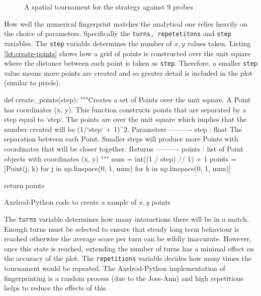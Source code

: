 \begin{figure}[!hbtp]
    \begin{center}
        
        \caption{A spatial tournament for the strategy against 9 probes}\label{fig:spatialtourn}
    \end{center}
\end{figure}


How well the numerical fingerprint matches the analytical one relies heavily on the choice of parameters.
Specifically the \texttt{turns, repetetitons} and \texttt{step} variables.
The \texttt{step} variable determines the number of $x,y$ values taken.
Listing \ref{lst:create-points} shows how a grid of points is constructed over the unit square where the distance between each point is taken as \texttt{step}.
Therefore, a smaller \texttt{step} value means more points are created and so greater detail is included in the plot (similar to pixels).

\begin{listing}[hbtp!]
\begin{SourceCode}
def create_points(step):
    """Creates a set of Points over the unit square.
    A Point has coordinates (x, y). This function constructs points that are
    separated by a step equal to `step`. The points are over the unit
    square which implies that the number created will be (1/`step` + 1)^2.
    Parameters
    ----------
    step : float
        The separation between each Point. Smaller steps will produce more
        Points with coordinates that will be closer together.
    Returns
    ----------
    points : list
        of Point objects with coordinates (x, y)
    """
    num = int((1 / step) // 1) + 1
    points = [Point(j, k) for j in np.linspace(0, 1, num)
              for k in np.linspace(0, 1, num)]

    return points
\end{SourceCode}
\caption{Axelrod-Python code to create a sample of $x,y$ points}
\label{lst:create-points}
\end{listing}

The \texttt{turns} variable determines how many interactions there will be in a match.
Enough turns must be selected to ensure that steady long term behaviour is reached otherwise the average score per turn can be wildly inaccurate.
However, once this state is reached, extending the number of turns has a minimal effect on the accuracy of the plot.
The \texttt{repetitions} variable decides how many times the tournament would be repeated.
The Axelrod-Python implementation of fingerprinting is a random process (due to the Joss-Ann) and high repetitions helps to reduce the effects of this.

